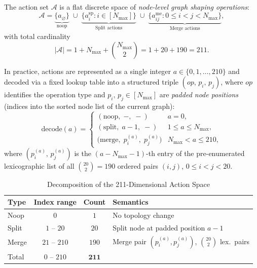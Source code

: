 The action set $\mathcal{A}$ is a flat discrete space of
\emph{node-level graph shaping operations}:
\begin{equation}
  \mathcal{A} =
  \underbrace{\{a_{\varnothing}\}}_{\text{noop}}
  \;\cup\;
  \underbrace{\bigl\{a_i^{\mathrm{sp}} : i \in [N_{\max}]\bigr\}}_{\text{Split actions}}
  \;\cup\;
  \underbrace{\bigl\{a_{ij}^{\mathrm{me}} :
    0 \leq i < j < N_{\max}\bigr\}}_{\text{Merge actions}},
  \label{eq:action_set}
\end{equation}
with total cardinality
\begin{equation}
  |\mathcal{A}| = 1 + N_{\max} + \binom{N_{\max}}{2}
               = 1 + 20 + 190 = 211.
  \label{eq:action_dim}
\end{equation}

In practice, actions are represented as a single integer
$a \in \{0, 1, \ldots, 210\}$ and decoded via a fixed lookup table
into a structured triple $(op,\,p_i,\,p_j)$, where $op$ identifies
the operation type and $p_i,\,p_j \in [N_{\max}]$ are
\emph{padded node positions} (indices into the sorted node list of
the current graph):
\begin{equation}
  \mathrm{decode}(a) =
  \begin{cases}
    (\mathrm{noop},\; -,\; -)
      & a = 0, \\[3pt]
    (\mathrm{split},\; a - 1,\; -)
      & 1 \leq a \leq N_{\max}, \\[3pt]
    \bigl(\mathrm{merge},\; p_i^{(a)},\; p_j^{(a)}\bigr)
      & N_{\max} < a \leq 210,
  \end{cases}
  \label{eq:decode}
\end{equation}
where $(p_i^{(a)},\, p_j^{(a)})$ is the $(a - N_{\max} - 1)$-th
entry of the pre-enumerated lexicographic list of all
$\binom{20}{2} = 190$ ordered pairs $(i,j)$, $0 \leq i < j < 20$.

\begin{table}[t]
  \centering
  \caption{Decomposition of the 211-Dimensional Action Space}
  \label{tab:action_space}
  \begin{tabular}{@{}lccl@{}}
    \toprule
    Type & Index range & Count & Semantics \\
    \midrule
    Noop   & $0$              & $1$   & No topology change \\
    Split  & $1$ -- $20$      & $20$  & Split node at padded position $a-1$ \\
    Merge  & $21$ -- $210$    & $190$ & Merge pair $(p_i^{(a)}, p_j^{(a)})$,\;
                                        $\binom{20}{2}$ lex.\ pairs \\
    \midrule
    Total  & $0$ -- $210$     & $\mathbf{211}$ & \\
    \bottomrule
  \end{tabular}
\end{table}


